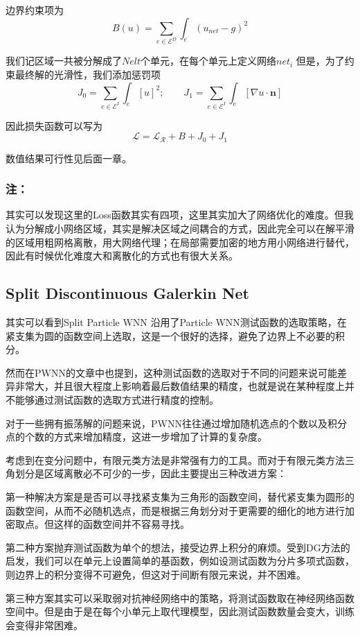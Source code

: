 边界约束项为
$$B (u)= \sum_{e\in\mathscr{E}^D}\int_e(u_{net} - g)^2$$


我们记区域一共被分解成了$Nelt$个单元，在每个单元上定义网络$net_i$
但是，为了约束最终解的光滑性，我们添加惩罚项
$$J_0 = \sum_{e\in\mathscr{E}^I}\int_{e}[u]^2; \qquad J_1 = \sum_{e\in\mathscr{E}^I}\int_{e}[\nabla u \cdot \textbf{n}]$$

因此损失函数可以写为
$$\mathcal{L} = \mathcal{L}_{\mathcal{R}} + B+J_0+J_1$$

数值结果可行性见后面一章。
\subsubsection*{注：}
其实可以发现这里的Loss函数其实有四项，这里其实加大了网络优化的难度。但我认为分解成小网络区域，其实是解决区域之间耦合的方式，因此完全可以在解平滑的区域用粗网格离散，用大网络代理；在局部需要加密的地方用小网络进行替代，因此有时候优化难度大和离散化的方式也有很大关系。

\subsection{Split Discontinuous Galerkin Net}
其实可以看到Split Particle WNN 沿用了Particle WNN测试函数的选取策略，在紧支集为圆的函数空间上选取，这是一个很好的选择，避免了边界上不必要的积分。

然而在PWNN的文章中也提到，这种测试函数的选取对于不同的问题来说可能差异非常大，并且很大程度上影响着最后数值结果的精度，也就是说在某种程度上并不能够通过测试函数的选取方式进行精度的控制。

对于一些拥有振荡解的问题来说，PWNN往往通过增加随机选点的个数以及积分点的个数的方式来增加精度，这进一步增加了计算的复杂度。

考虑到在变分问题中，有限元类方法是非常强有力的工具。而对于有限元类方法三角划分是区域离散必不可少的一步，因此主要提出三种改进方案：

第一种解决方案是是否可以寻找紧支集为三角形的函数空间，替代紧支集为圆形的函数空间，从而不必随机选点，而是根据三角划分对于更需要的细化的地方进行加密取点。但这样的函数空间并不容易寻找。

第二种方案抛弃测试函数为单个的想法，接受边界上积分的麻烦。受到DG方法的启发，我们可以在单元上设置简单的基函数，例如设测试函数为分片多项式函数，则边界上的积分变得不可避免，但这对于间断有限元来说，并不困难。

第三种方案其实可以采取弱对抗神经网络中的策略，将测试函数取在神经网络函数空间中。但是由于是在每个小单元上取代理模型，因此测试函数数量会变大，训练会变得非常困难。

